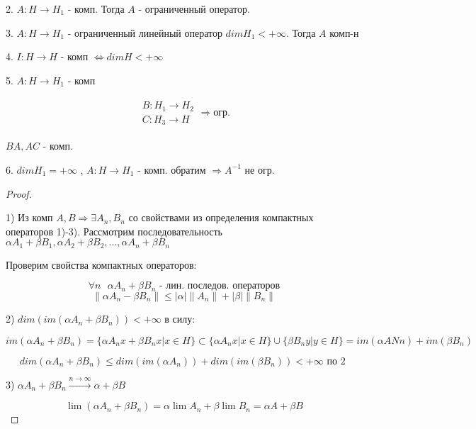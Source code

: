 \documentclass[12pt, a4paper]{report}
\begin{document}
2. \( A : H \to H_1  \) - комп. Тогда \( A  \) - ограниченный оператор. 

3. \( A : H \to  H_1  \) - ограниченный линейный оператор \( dim H_1 < + \infty  \). Тогда \( A \) комп-н 

4. \( I : H \to  H  \) - комп \( \Leftrightarrow  dim H < +\infty   \) 

5. \( A : H \to  H_1 \) - комп 

\[ \begin{aligned}
\begin{aligned}
B : H_1 \to  H_2 \\ 
C: H_3 \to  H
\end{aligned}
\Rightarrow \text{огр.}  
\end{aligned} \] 

\( BA , AC \) - комп. 

6. \( dim H_1 = + \infty  \) , \( A : H \to H_1 \) - комп. обратим \( \Rightarrow A^{-1}  \) не огр. 

\begin{proof} \(  \) 

    1) Из комп \( A , B  \Rightarrow \exists  A_n , B_n \) со свойствами из определения компактных операторов 1)-3). Рассмотрим последовательность \( \alpha A_1 + \beta B_1 , \alpha A_2 + \beta B_2  ,..., \alpha A_n + \beta B_n  \) 

    Проверим свойства компактных операторов: 

    \[ \forall  n \text{ }  \alpha A_n + \beta B_n  \text{ - лин. последов. операторов} \] 
    \[ \left\lVert \alpha A_n   - \beta B_n\right\rVert \le  \left\lvert \alpha  \right\rvert \left\lVert A_n \right\rVert + \left\lvert \beta \right\rvert \left\lVert B_n \right\rVert  \] 

    2) \( dim (im (\alpha A_n + \beta B_n )) < + \infty  \) в силу: 

    \[  im (\alpha A_n + \beta B_n )  = \{\alpha A_n x + \beta B_n x | x \in  H \} \subset \{\alpha A_n x | x \in  H \} \cup \{\beta B_n y | y \in  H\}  = im (\alpha AN n) + im (\beta B_n)\] 

    \[ dim (\alpha A_n + \beta B_n ) \le  dim (im (\alpha A_n)) + dim( im (\beta B_n ))  < + \infty  \text{ по 2 } \] 

    3) \( \alpha A_n+ \beta B_n \xrightarrow{ n \to  \infty }    \alpha + \beta B  \) 

    \[ \lim (\alpha A_n + \beta B_n ) = \alpha \lim  A_n+ \beta \lim B_n = \alpha A + \beta B   \] 

\end{proof}
\end{document}
